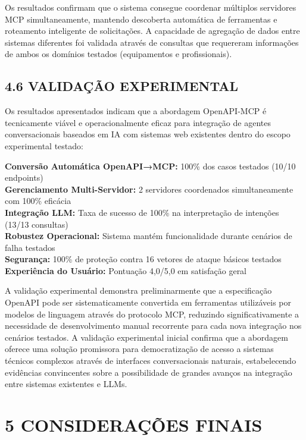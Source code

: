 \documentclass[
]{article}
\begin{document}
Os resultados confirmam que o sistema consegue coordenar múltiplos
servidores MCP simultaneamente, mantendo descoberta automática de
ferramentas e roteamento inteligente de solicitações. A capacidade de
agregação de dados entre sistemas diferentes foi validada através de
consultas que requereram informações de ambos os domínios testados
(equipamentos e profissionais).

\subsection{4.6 VALIDAÇÃO
EXPERIMENTAL}\label{validauxe7uxe3o-experimental}

Os resultados apresentados indicam que a abordagem OpenAPI-MCP é
tecnicamente viável e operacionalmente eficaz para integração de agentes
conversacionais baseados em IA com sistemas web existentes dentro do
escopo experimental testado:

\textbf{Conversão Automática OpenAPI→MCP:} 100\% dos casos testados
(10/10 endpoints)\\
\textbf{Gerenciamento Multi-Servidor:} 2 servidores coordenados
simultaneamente com 100\% eficácia\\
\textbf{Integração LLM:} Taxa de sucesso de 100\% na interpretação de
intenções (13/13 consultas)\\
\textbf{Robustez Operacional:} Sistema mantém funcionalidade durante
cenários de falha testados\\
\textbf{Segurança:} 100\% de proteção contra 16 vetores de ataque
básicos testados\\
\textbf{Experiência do Usuário:} Pontuação 4,0/5,0 em satisfação geral

A validação experimental demonstra preliminarmente que a especificação
OpenAPI pode ser sistematicamente convertida em ferramentas utilizáveis
por modelos de linguagem através do protocolo MCP, reduzindo
significativamente a necessidade de desenvolvimento manual recorrente
para cada nova integração nos cenários testados. A validação
experimental inicial confirma que a abordagem oferece uma solução
promissora para democratização de acesso a sistemas técnicos complexos
através de interfaces conversacionais naturais, estabelecendo evidências
convincentes sobre a possibilidade de grandes avanços na integração
entre sistemas existentes e LLMs.

\section{5 CONSIDERAÇÕES FINAIS}\label{considerauxe7uxf5es-finais}
\end{document}
